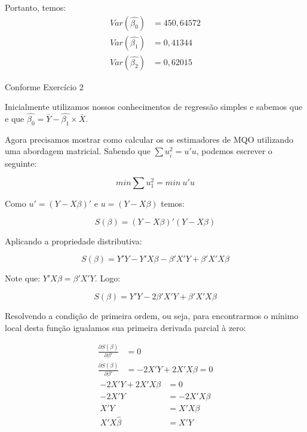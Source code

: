 \documentclass[]{ufpe-exercises}
\begin{document}
\begin{questions}
\begin{parts}
\begin{solution}
			Portanto, temos:
			\begin{align*}
				Var(\hat{\beta_{0}}) & = 450,64572 \\
				Var(\hat{\beta_{1}}) & = 0,41344   \\
				Var(\hat{\beta_{2}}) & = 0,62015
			\end{align*}

		\end{solution}

	\end{parts}

	\question Conforme Exercício 2

	\begin{solution}
		Inicialmente utilizamos nossos conhecimentos de regressão simples e sabemos que  e que \(\hat{\beta_{0}} = \bar{Y} - \hat{\beta_{1}} \times \bar{X}\).

		Agora precisamos mostrar como calcular os os estimadores de MQO utilizando uma abordagem matricial. Sabendo que \(\sum{u_{i}^{2}} = u'u\), podemos escrever o seguinte:

		\[min\sum{u_{1}^{2}} = min\: u'u\]

		Como \(u' = (Y - X\beta)'\) e \(u = (Y - X\beta)\) temos:

		\[S(\beta) = (Y - X\beta)'(Y - X\beta)\]

		Aplicando a propriedade distributiva:

		\[S(\beta) = Y'Y - Y'X\beta - \beta'X'Y + \beta'X'X\beta\]

		Note que: \(Y'X\beta = \beta'X'Y\). Logo:

		\[S(\beta) = Y'Y - 2\beta'X'Y + \beta'X'X\beta\]

		Resolvendo a condição de primeira ordem, ou seja, para encontrarmos o mínimo local desta função igualamos sua primeira derivada parcial à zero:

		\begin{align*}
			\frac{\partial S(\beta)}{\partial \beta'} & = 0                     \\
			\frac{\partial S(\beta)}{\partial \beta'} & = -2X'Y + 2X'X\beta = 0
		\end{align*}
		\begin{align*}
			-2X'Y + 2X'X\beta & = 0          \\
			-2X'Y             & = -2X'X\beta \\
			X'Y               & = X'X\beta   \\
			X'X\hat{\beta}    & = X'Y
		\end{align*}


\end{solution}
\end{questions}
\end{document}
